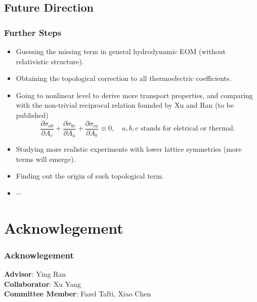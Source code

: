 \documentclass[10pt,aspectratio=43,xcolor=x11names,t]{beamer}%
\begin{document}
		
		
	\subsection{Future Direction}
		\begin{frame}\frametitle{Further Steps}
			\begin{itemize}
				\item Guessing the missing term in general hydrodynamic EOM (without relativistic structure).
				\item Obtaining the topological correction to all thermoelectric coefficients.
				\item Going to nonlinear level to derive more transport properties, and comparing with the non-trivial reciprocal relation founded by Xu and Ran (to be published)
				\begin{equation*}
					\dfrac{\partial \sigma_{ab}}{\partial A_c}+\dfrac{\partial \sigma_{bc}}{\partial A_a}+\dfrac{\partial \sigma_{ca}}{\partial A_b}\equiv0, \quad a,b,c \text{ stands for eletrical or thermal}.
				\end{equation*}
				\item Studying more realistic experiments with lower lattice symmetries (more terms will emerge).
				\item Finding out the origin of such topological term.
				\item $\cdots$
			\end{itemize}
		\end{frame}
		
		
	
\section*{Acknowlegement}
	\begin{frame}\frametitle{Acknowlegement}
		\textbf{Advisor}: Ying Ran\\
		\textbf{Collaborator}: Xu Yang\\
		\textbf{Committee Member}: Fazel Tafti, Xiao Chen\\[2em]

		\only<2>{
			\begin{center}
				\Huge Thanks!
			\end{center}
		}
	\end{frame}
\end{document}

